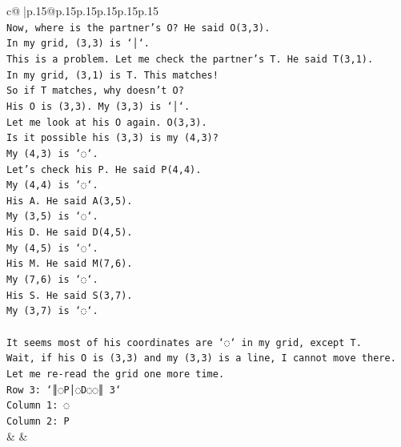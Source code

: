 \documentclass{article}
\begin{document}
{\begin{supertabular}{c@{$\;$}|p{.15\linewidth}@{}p{.15\linewidth}p{.15\linewidth}p{.15\linewidth}p{.15\linewidth}p{.15\linewidth}}
{{{\\ 
\texttt{Now, where is the partner's O? He said O(3,3).} \\
\texttt{In my grid, (3,3) is `│`.} \\
\texttt{This is a problem. Let me check the partner's T. He said T(3,1).} \\
\texttt{In my grid, (3,1) is T. This matches!} \\
\texttt{So if T matches, why doesn't O?} \\
\texttt{His O is (3,3). My (3,3) is `│`.} \\
\texttt{Let me look at his O again. O(3,3).} \\
\texttt{Is it possible his (3,3) is my (4,3)?} \\
\texttt{My (4,3) is `◌`.} \\
\texttt{Let's check his P. He said P(4,4).} \\
\texttt{My (4,4) is `◌`.} \\
\texttt{His A. He said A(3,5).} \\
\texttt{My (3,5) is `◌`.} \\
\texttt{His D. He said D(4,5).} \\
\texttt{My (4,5) is `◌`.} \\
\texttt{His M. He said M(7,6).} \\
\texttt{My (7,6) is `◌`.} \\
\texttt{His S. He said S(3,7).} \\
\texttt{My (3,7) is `◌`.} \\
\\ 
\texttt{It seems most of his coordinates are `◌` in my grid, except T.} \\
\texttt{Wait, if his O is (3,3) and my (3,3) is a line, I cannot move there.} \\
\texttt{Let me re{-}read the grid one more time.} \\
\texttt{Row 3: `║◌P│◌D◌◌║ 3`} \\
\texttt{Column 1: ◌} \\
\texttt{Column 2: P} \\
            }
        }
    }
    & & \\ \\


\end{supertabular}}
\end{document}
